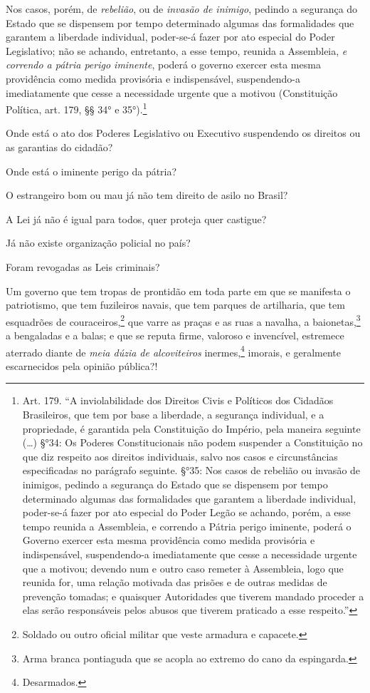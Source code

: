 Nos casos, porém, de \emph{rebelião}, ou de \emph{invasão de inimigo},
pedindo a segurança do Estado que se dispensem por tempo determinado
algumas das formalidades que garantem a liberdade individual, poder-se-á
fazer por ato especial do Poder Legislativo; não se achando, entretanto,
a esse tempo, reunida a Assembleia, \emph{e correndo a pátria perigo
iminente}, poderá o governo exercer esta mesma providência como medida
provisória e indispensável, suspendendo-a imediatamente que cesse a
necessidade urgente que a motivou (Constituição Política,
art. 179, §§ 34° e 35°).\footnote{Art. 179. ``A inviolabilidade dos
  Direitos Civis e Políticos dos Cidadãos Brasileiros, que tem por base
  a liberdade, a segurança individual, e a propriedade, é garantida pela
  Constituição do Império, pela maneira seguinte (\ldots{}) §°34: Os Poderes
  Constitucionais não podem suspender a Constituição no que diz respeito
  aos direitos individuais, salvo nos casos e circunstâncias
  especificadas no parágrafo seguinte.
  §°35: Nos casos de rebelião ou invasão de inimigos, pedindo a
  segurança do Estado que se dispensem por tempo determinado algumas das
  formalidades que garantem a liberdade individual, poder-se-á fazer por
  ato especial do Poder Legão se achando, porém, a esse tempo
  reunida a Assembleia, e correndo a Pátria perigo iminente, poderá o
  Governo exercer esta mesma providência como medida provisória e
  indispensável, suspendendo-a imediatamente que cesse a necessidade
  urgente que a motivou; devendo num e outro caso remeter à Assembleia,
  logo que reunida for, uma relação motivada das prisões e de outras
  medidas de prevenção tomadas; e quaisquer Autoridades que tiverem
  mandado proceder a elas serão responsáveis pelos abusos que tiverem
  praticado a esse respeito.''}

Onde está o ato dos Poderes Legislativo ou Executivo suspendendo os
direitos ou as garantias do cidadão?

Onde está o iminente perigo da pátria?

O estrangeiro bom ou mau já não tem direito de asilo no Brasil?

A Lei já não é igual para todos, quer proteja quer castigue?

Já não existe organização policial no país?

Foram revogadas as Leis criminais?

Um governo que tem tropas de prontidão em toda parte em que se manifesta
o patriotismo, que tem fuzileiros navais, que tem parques de artilharia,
que tem esquadrões de couraceiros,\footnote{Soldado ou outro oficial
  militar que veste armadura e capacete.} que varre as praças e as ruas
a navalha, a baionetas,\footnote{Arma branca pontiaguda que se acopla
  ao extremo do cano da espingarda.} a bengaladas e a balas; e que se
reputa firme, valoroso e invencível, estremece aterrado diante de
\emph{meia dúzia de alcoviteiros} inermes,\footnote{Desarmados.}
imorais, e geralmente escarnecidos pela opinião pública?!

